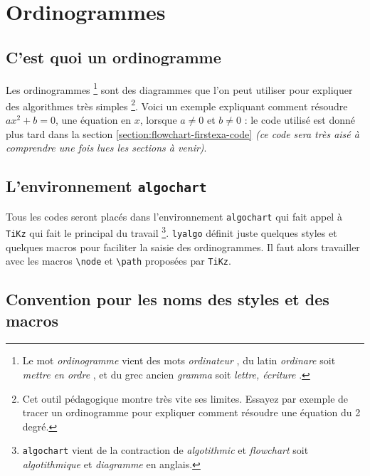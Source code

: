 \documentclass[12pt,a4paper]{article}
\theoremstyle{definition}
\newcommand\myquote[1]{{\itshape \og #1 \fg}}
\begin{document}
\section{Ordinogrammes}

\subsection{C'est quoi un ordinogramme} \label{section:flowchart-firstexa}

Les ordinogrammes
\footnote{
    Le mot \myquote{ordinogramme} vient des mots \myquote{ordinateur}, du latin \myquote{ordinare} soit \myquote{mettre en ordre}, et du grec ancien \myquote{gramma} soit \myquote{lettre, écriture}.
}
sont des diagrammes que l'on peut utiliser pour expliquer des algorithmes très simples
\footnote{
    Cet outil pédagogique montre très vite ses limites. Essayez par exemple de tracer un ordinogramme pour expliquer comment résoudre une équation du 2\ieme{} degré.
}.
Voici un exemple expliquant comment résoudre $a x^2 + b = 0$, une équation en $x$, lorsque $a \neq 0$ et $b \neq 0$ : le code utilisé est donné plus tard dans la section \ref{section:flowchart-firstexa-code} \emph{(ce code sera très aisé à comprendre une fois lues les sections à venir)}.

\begin{center}
    \small
    
\end{center}




\subsection{L'environnement \texttt{algochart}}

Tous les codes seront placés dans l'environnement \verb+algochart+ qui fait appel à \verb+TiKz+ qui fait le principal du travail
\footnote{
	\texttt{algochart} vient de la contraction de \myquote{algotithmic} et \myquote{flowchart} soit \myquote{algotithmique} et \myquote{diagramme} en anglais.
}.
\verb+lyalgo+ définit juste quelques styles et quelques macros pour faciliter la saisie des ordinogrammes.
Il faut alors travailler avec les macros \verb+\node+ et \verb+\path+ proposées par \verb+TiKz+.




\subsection{Convention pour les noms des styles et des macros}
\end{document}
